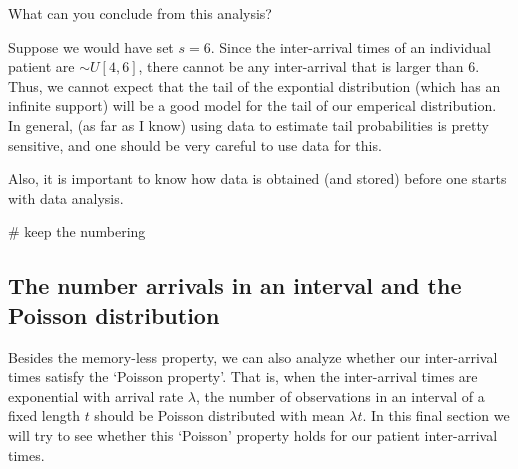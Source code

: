 \begin{exercise}
What can you conclude from this analysis?
  \begin{solution}
    Suppose we would have set $s=6$.
    Since the inter-arrival times of an individual patient are $\sim U[4, 6]$, there cannot be any inter-arrival that is larger than $6$.
    Thus, we cannot expect that the tail of the expontial distribution (which has an infinite support) will be a good model for the tail of our emperical distribution.
    In general, (as far as I know) using data to estimate tail probabilities is pretty sensitive, and one should be very careful to use data for this.

    Also, it is important to know how data is obtained (and stored) before one starts with data analysis.

\begin{pyverbatim}
# keep the numbering
\end{pyverbatim}
  \end{solution}
\end{exercise}


\subsection{The number arrivals in an interval and the Poisson distribution}

Besides the memory-less property, we can also analyze whether our inter-arrival times satisfy the `Poisson property'.
That is, when the inter-arrival times are exponential with arrival rate $\lambda$, the number of observations in an interval of a fixed length $t$ should be Poisson distributed with mean $\lambda t$.  In this final section we will try to see whether this `Poisson' property holds for our patient inter-arrival times.

